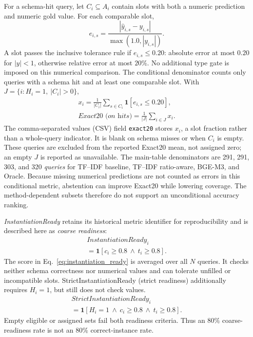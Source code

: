 \documentclass[pdflatex,iicol,sn-basic,Numbered]{sn-jnl}
\begin{document}
For a schema-hit query, let $C_i\subseteq A_i$ contain slots with both a numeric prediction and numeric gold value. For each comparable slot,
\begin{equation}
 e_{i,s}=\frac{|\hat{y}_{i,s}-y_{i,s}|}{\max(1.0,|y_{i,s}|)}.
\label{eq:bounded_error}
\end{equation}
A slot passes the inclusive tolerance rule if $e_{i,s}\leq0.20$: absolute error at most $0.20$ for $|y|<1$, otherwise relative error at most $20\%$. No additional type gate is imposed on this numerical comparison. The conditional denominator counts only queries with a schema hit and at least one comparable slot. With $J=\{i:H_i=1,\ |C_i|>0\}$,
\begin{equation}
\begin{gathered}
x_i=\frac{1}{|C_i|}\sum_{s\in C_i}\mathbf{1}[e_{i,s}\leq0.20],
\\[3pt]
\textit{Exact20 (on hits)}=\frac{1}{|J|}\sum_{i\in J}x_i.
\end{gathered}
\label{eq:exact20}
\end{equation}
The comma-separated values (CSV) field \texttt{exact20} stores $x_i$, a slot fraction rather than a whole-query indicator. It is blank on schema misses or when $C_i$ is empty. These queries are excluded from the reported Exact20 mean, not assigned zero; an empty $J$ is reported as unavailable. The main-table denominators are 291, 291, 303, and 320 \emph{queries} for TF--IDF baseline, TF--IDF ratio-aware, BGE-M3, and Oracle. Because missing numerical predictions are not counted as errors in this conditional metric, abstention can improve Exact20 while lowering coverage. The method-dependent subsets therefore do not support an unconditional accuracy ranking.

\textit{InstantiationReady} retains its historical metric identifier for reproducibility and is described here as \emph{coarse readiness}:
\begin{equation}
\begin{gathered}
\mathit{InstantiationReady}_i\\[2pt]
=\mathbf{1}[c_i\geq0.8\ \wedge\ t_i\geq0.8].
\end{gathered}
\label{eq:instantiation_ready}
\end{equation}
The score in Eq.~\eqref{eq:instantiation_ready} is averaged over all $N$ queries. It checks neither schema correctness nor numerical values and can tolerate unfilled or incompatible slots. StrictInstantiationReady (strict readiness) additionally requires $H_i=1$, but still does not check values.
\begin{equation}
\begin{gathered}
\mathit{StrictInstantiationReady}_i\\[2pt]
= \mathbf{1}[H_i=1\ \wedge\ c_i\geq0.8\ \wedge\ t_i\geq0.8].
\end{gathered}
\label{eq:strict_instantiation_ready}
\end{equation} Empty eligible or assigned sets fail both readiness criteria. Thus an $80\%$ coarse-readiness rate is not an $80\%$ correct-instance rate.
\end{document}
